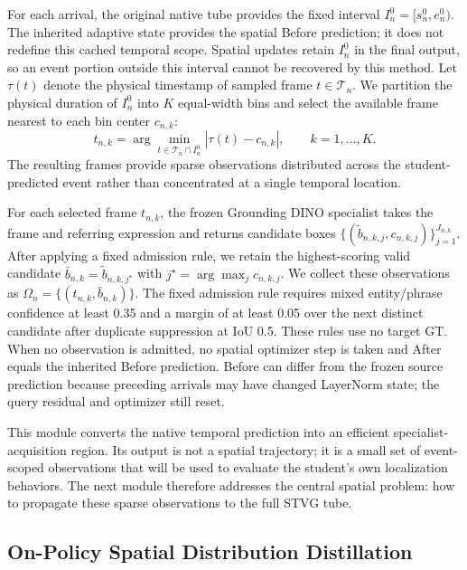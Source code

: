 \documentclass[10pt,twocolumn,letterpaper]{article}
\begin{document}
For each arrival, the original native tube provides the fixed interval
$I_n^0=[s_n^0,e_n^0)$. The inherited adaptive state provides the
spatial Before prediction; it does not redefine this cached temporal scope.
Spatial updates retain $I_n^0$ in the final output, so an event portion
outside this interval cannot be recovered by this method.
Let $\tau(t)$ denote the physical timestamp of sampled frame
$t\in\mathcal T_n$.
We partition the physical duration of $I_n^0$ into $K$ equal-width bins and
select the available frame nearest to each bin center $c_{n,k}$:
\begin{equation}
	t_{n,k}
	=
	\arg\min_{t\in\mathcal T_n\cap I_n^0}
	\left|\tau(t)-c_{n,k}\right|,
	\qquad k=1,\ldots,K .
	\label{eq:event-sampling}
\end{equation}
The resulting frames provide sparse observations distributed across the
student-predicted event rather than concentrated at a single temporal
location.

For each selected frame $t_{n,k}$, the frozen Grounding DINO specialist takes
the frame and referring expression and returns candidate boxes
$\{(\widetilde b_{n,k,j},c_{n,k,j})\}_{j=1}^{J_{n,k}}$.
After applying a fixed admission rule, we retain the highest-scoring valid
candidate
$\bar b_{n,k}=\widetilde b_{n,k,j^\star}$ with
$j^\star=\arg\max_j c_{n,k,j}$.
We collect these observations as
$\Omega_n=\{(t_{n,k},\bar b_{n,k})\}$.
The fixed admission rule requires mixed entity/phrase confidence at least
0.35 and a margin of at least 0.05 over the next distinct candidate after
duplicate suppression at IoU 0.5. These rules use no target GT.
When no observation is admitted, no spatial optimizer step is taken and
After equals the inherited Before prediction. Before can differ from the
frozen source prediction because preceding arrivals may have changed
LayerNorm state; the query residual and optimizer still reset.

This module converts the native temporal prediction into an efficient
specialist-acquisition region. Its output is not a spatial trajectory; it is a
small set of event-scoped observations that will be used to evaluate the
student's own localization behaviors. The next module therefore addresses the
central spatial problem: how to propagate these sparse observations to the
full STVG tube.


\subsection{On-Policy Spatial Distribution Distillation}
\label{sec:spatial-opd}
\end{document}
